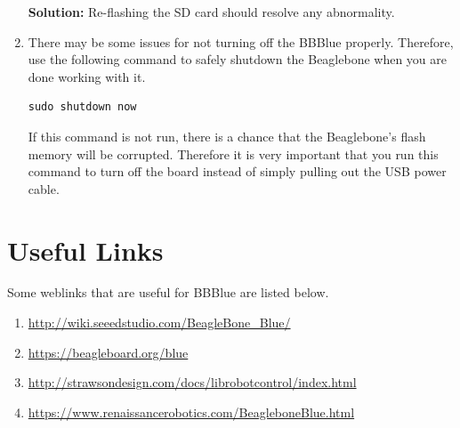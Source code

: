 \begin{enumerate}[\emph{T\#}1:]
    \textbf{Solution:}  Re-flashing the SD card should resolve any abnormality.

    
  \item There may be some issues for not turning off the BBBlue properly. Therefore, use the following command to safely shutdown the Beaglebone when you are done working with it.

\begin{verbatim}
sudo shutdown now
\end{verbatim}
    If this command is not run, there is a chance that the Beaglebone's flash memory will be corrupted. Therefore it is very important that you run this command to turn off the board instead of simply pulling out the USB power cable.

\end{enumerate}

\section{Useful Links}
\label{sec:useful-links}

Some weblinks that are useful for BBBlue are listed below. 

\begin{enumerate}
\item \href{http://wiki.seeedstudio.com/BeagleBone_Blue/}{http://wiki.seeedstudio.com/BeagleBone\_Blue/}
  
\item \href{https://beagleboard.org/blue}{https://beagleboard.org/blue}
  
\item \href{http://strawsondesign.com/docs/librobotcontrol/index.html}{http://strawsondesign.com/docs/librobotcontrol/index.html}
  
\item \href{https://www.renaissancerobotics.com/BeagleboneBlue.html}{https://www.renaissancerobotics.com/BeagleboneBlue.html}
\end{enumerate}



